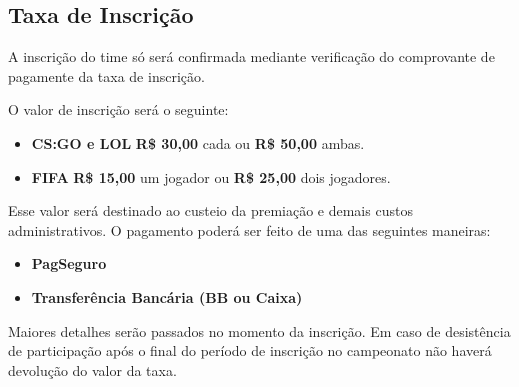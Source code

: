 \subsection{Taxa de Inscrição}

A inscrição do time só será confirmada mediante verificação do comprovante de pagamente da taxa de inscrição.

O valor de inscrição será o seguinte:

\begin{itemize}
	\item \textbf{CS:GO e LOL} \textbf{R\$ 30,00} cada ou \textbf{R\$ 50,00} ambas.
	\item \textbf{FIFA} \textbf{R\$ 15,00} um jogador ou \textbf{R\$ 25,00} dois jogadores.
\end{itemize}

Esse valor será destinado ao custeio da premiação e demais custos administrativos. O pagamento poderá ser feito de uma das seguintes maneiras:

\begin{itemize}
	\item \textbf{PagSeguro}
	\item \textbf{Transferência Bancária (BB ou Caixa)}
\end{itemize}

Maiores detalhes serão passados no momento da inscrição. Em caso de desistência de participação após o final do período de inscrição no campeonato não haverá devolução do valor da taxa.
